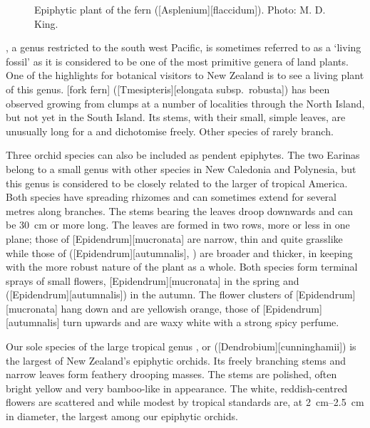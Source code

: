 \begin{figure}[!b]
\begin{minipage}[t]{0.7\textwidth}
\begin{minipage}[t]{(\textwidth-\fgap) * \real{0.436}}
			\caption[Epiphytic plant of the fern drooping spleenwort (\emph{Asplenium flaccidum})]{Epiphytic plant of the fern  ([Asplenium][flaccidum]).
			Photo: M. D. King.}%
			\label{fig:43asplenium-jlaccidum}
		\end{minipage}
	\end{minipage}
\end{figure}

, a genus restricted to the south west Pacific, is sometimes referred to as a `living fossil' as it is considered to be one of the most primitive genera of land plants.
One of the highlights for botanical visitors to New Zealand is to see a living plant of this genus.
[fork fern] ([Tmesipteris][elongata subsp.\ robusta]) has been observed growing from  clumps at a number of localities through the North Island, but not yet in the South Island.
Its stems, with their small, simple leaves, are unusually long for a  and dichotomise freely.
Other species of  rarely branch.

Three orchid species can also be included as pendent epiphytes.
The two Earinas belong to a small genus with other species in New Caledonia and Polynesia, but this genus is considered to be closely related to the larger  of tropical America.
Both species have spreading rhizomes and can sometimes extend for several metres along branches.
The stems bearing the leaves droop downwards and can be \SI{30}{\centi\metre} or more long.
The leaves are formed in two rows, more or less in one plane; those of [Epidendrum][mucronata] are narrow, thin and quite grasslike while those of  ([Epidendrum][autumnalis], ) are broader and thicker, in keeping with the more robust nature of the plant as a whole.
Both species form terminal sprays of small flowers, [Epidendrum][mucronata] in the spring and  ([Epidendrum][autumnalis]) in the autumn.
The flower clusters of [Epidendrum][mucronata] hang down and are yellowish orange, those of [Epidendrum][autumnalis] turn upwards and are waxy white with a strong spicy perfume.

Our sole species of the large tropical genus ,  or  ([Dendrobium][cunninghamii]) is the largest of New Zealand's epiphytic orchids.
Its freely branching stems and narrow leaves form feathery drooping masses.
The stems are polished, often bright yellow and very bamboo-like in appearance.
The white, reddish-centred flowers are scattered and while modest by tropical standards are, at \SIrange{2}{2.5}{\centi\metre} in diameter, the largest among our epiphytic orchids.

